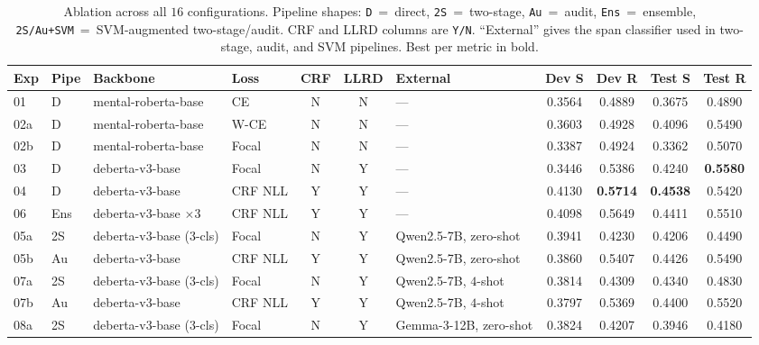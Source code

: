 \documentclass[journal]{IEEEtran}
\begin{document}
\begin{table}[!t]
\renewcommand{\arraystretch}{1.15}
\caption{Ablation across all $16$ configurations. Pipeline shapes:
\texttt{D}~=~direct, \texttt{2S}~=~two-stage, \texttt{Au}~=~audit,
\texttt{Ens}~=~ensemble, \texttt{2S/Au+SVM}~=~SVM-augmented
two-stage/audit. CRF and LLRD columns are \texttt{Y/N}. ``External''
gives the span classifier used in two-stage, audit, and SVM
pipelines. Best per metric in bold.}
\label{tab:ablation}
\centering
\footnotesize
\begin{tabular}{l l l l c c l c c c c}
\hline
\textbf{Exp} & \textbf{Pipe} & \textbf{Backbone} & \textbf{Loss}
& \textbf{CRF} & \textbf{LLRD} & \textbf{External}
& \textbf{Dev S} & \textbf{Dev R} & \textbf{Test S} & \textbf{Test R} \\
\hline
01  & D    & mental-roberta-base       & CE          & N & N & ---                          & 0.3564 & 0.4889 & 0.3675 & 0.4890 \\
02a & D    & mental-roberta-base       & W-CE        & N & N & ---                          & 0.3603 & 0.4928 & 0.4096 & 0.5490 \\
02b & D    & mental-roberta-base       & Focal       & N & N & ---                          & 0.3387 & 0.4924 & 0.3362 & 0.5070 \\
03  & D    & deberta-v3-base           & Focal       & N & Y & ---                          & 0.3446 & 0.5386 & 0.4240 & \textbf{0.5580} \\
04  & D    & deberta-v3-base           & CRF NLL     & Y & Y & ---                          & 0.4130 & \textbf{0.5714} & \textbf{0.4538} & 0.5420 \\
06  & Ens  & deberta-v3-base $\times 3$ & CRF NLL    & Y & Y & ---                          & 0.4098 & 0.5649 & 0.4411 & 0.5510 \\
\hline
05a & 2S   & deberta-v3-base (3-cls)   & Focal       & N & Y & Qwen2.5-7B, zero-shot        & 0.3941 & 0.4230 & 0.4206 & 0.4490 \\
05b & Au   & deberta-v3-base           & CRF NLL     & Y & Y & Qwen2.5-7B, zero-shot        & 0.3860 & 0.5407 & 0.4426 & 0.5490 \\
07a & 2S   & deberta-v3-base (3-cls)   & Focal       & N & Y & Qwen2.5-7B, $4$-shot         & 0.3814 & 0.4309 & 0.4340 & 0.4830 \\
07b & Au   & deberta-v3-base           & CRF NLL     & Y & Y & Qwen2.5-7B, $4$-shot         & 0.3797 & 0.5369 & 0.4400 & 0.5520 \\
08a & 2S   & deberta-v3-base (3-cls)   & Focal       & N & Y & Gemma-3-12B, zero-shot       & 0.3824 & 0.4207 & 0.3946 & 0.4180 \\

\end{tabular}
\end{table}
\end{document}
